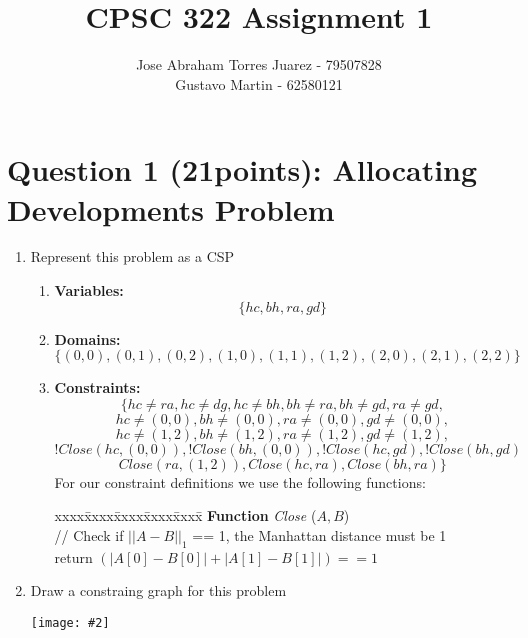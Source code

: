 \documentclass{article}
\def\ans#1{{\color{ans}#1}}
\newcommand{\centerfig}[2]{\begin{center}\texttt{[image: \#2]}\end{center}}
\begin{document}
\title{CPSC 322 Assignment 1}
\author{
    Jose Abraham Torres Juarez - 79507828 \\
    Gustavo Martin - 62580121
}
\date{}
\maketitle
\vspace{-2em}


\section{Question 1 (21points): Allocating Developments Problem}

\begin{enumerate}[label=(\alph*)]
    \item Represent this problem as a CSP
    \begin{enumerate}\color{ans}
        \item \textbf{Variables: }
        \[
            \{ hc, bh, ra, gd \}
        \]
        \item \textbf{Domains: }
        \[
            \{ (0,0), (0,1), (0,2), (1,0), (1,1), (1,2), (2,0), (2,1), (2,2) \}
        \]
        \item \textbf{Constraints: }
        \[
            \{ hc \neq ra, hc \neq dg, hc \neq bh, bh \neq ra, bh \neq gd, ra \neq gd,
        \]
        \[
            hc \neq (0,0), bh \neq (0,0), ra \neq (0,0), gd \neq (0,0),
        \]
        \[
            hc \neq (1,2), bh \neq (1,2), ra \neq (1,2), gd \neq (1,2),
        \]
        \[
            !Close(hc,(0,0)), !Close(bh,(0,0)), !Close(hc,gd), !Close(bh,gd)
        \]
        \[
            Close(ra,(1,2)), Close(hc,ra), Close(bh,ra) \}
        \]
        \ans{
            For our constraint definitions we use the following functions:
        }
        \begin{tabbing}
        xxxx\=xxxx\=xxxx\=xxxx\=xxxx\= \kill \color{ans}
        {\bf Function} {\em Close} ($A,B$)\\ [0pt \color{ans}]
        \> // Check if $|| A - B ||_1$ == 1, the Manhattan distance must be 1\\
        \> return $( |A[0] - B[0]| + |A[1] - B[1]| ) == 1$ \\
        \end{tabbing}
    \end{enumerate}
    \item Draw a constraing graph for this problem
    \centerfig{0.8}{../figs/q1.png}
\end{enumerate}
\end{document}
